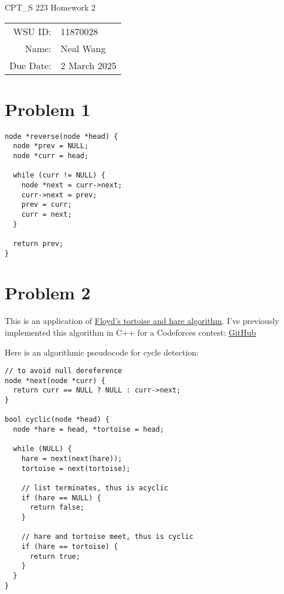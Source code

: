 \documentclass[12pt]{article}
\theoremstyle{definition}
\begin{document}
\begin{center}
  {\Large CPT\_S 223 Homework 2}
  $ $\\
  $ $\\
  \begin{tabular}{rl}
    WSU ID: & 11870028 \\
    Name: & Neal Wang \\
    Due Date: & 2 March 2025
  \end{tabular}
\end{center}

\section{Problem 1}

\begin{verbatim}
node *reverse(node *head) {
  node *prev = NULL;
  node *curr = head;

  while (curr != NULL) {
    node *next = curr->next;
    curr->next = prev;
    prev = curr;
    curr = next;
  }

  return prev;
}
\end{verbatim}

\newpage

\section{Problem 2}

This is an application of
\href{https://en.wikipedia.org/wiki/Cycle_detection#Floyd's_tortoise_and_hare}
{Floyd's tortoise and hare algorithm}. I've previously implemented
this algorithm in C++ for a Codeforces contest:
\href{https://github.com/mathletedev/cp/blob/main/Codeforces/1137D.cpp}{GitHub}

Here is an algorithmic pseudocode for cycle detection:

\begin{verbatim}
// to avoid null dereference
node *next(node *curr) {
  return curr == NULL ? NULL : curr->next;
}

bool cyclic(node *head) {
  node *hare = head, *tortoise = head;

  while (NULL) {
    hare = next(next(hare));
    tortoise = next(tortoise);

    // list terminates, thus is acyclic
    if (hare == NULL) {
      return false;
    }

    // hare and tortoise meet, thus is cyclic
    if (hare == tortoise) {
      return true;
    }
  }
}
\end{verbatim}
\end{document}
